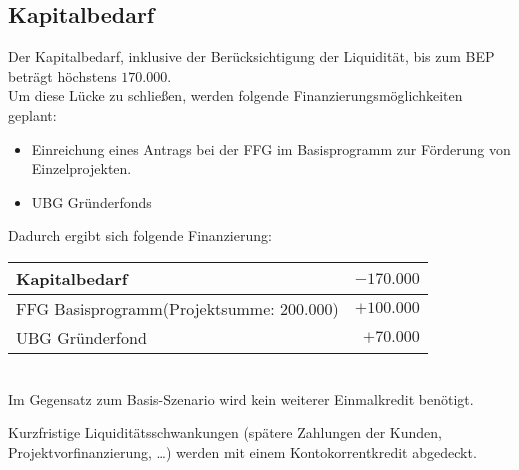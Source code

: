 \subsection{Kapitalbedarf}
Der Kapitalbedarf, inklusive der Berücksichtigung der Liquidität, bis zum BEP beträgt höchstens $170.000$\officialeuro.\\
Um diese Lücke zu schließen, werden folgende Finanzierungsmöglichkeiten geplant:
\begin{itemize}
	\item Einreichung eines Antrags bei der FFG im Basisprogramm zur Förderung von Einzelprojekten.
	\item UBG Gründerfonds
\end{itemize}
Dadurch ergibt sich folgende Finanzierung:\\
\begin{tabular}{l r}
	Kapitalbedarf & $-170.000$\officialeuro \\
	\hline
	FFG Basisprogramm(Projektsumme: $200.000$\officialeuro) & $+100.000$\officialeuro \\
	UBG Gründerfond & $+70.000$\officialeuro \\
	\bottomrule
\end{tabular}\\

\noindent Im Gegensatz zum Basis-Szenario wird kein weiterer Einmalkredit benötigt.

\noindent Kurzfristige Liquiditätsschwankungen (spätere Zahlungen der Kunden, Projektvorfinanzierung, …) werden mit einem Kontokorrentkredit abgedeckt.

\newpage
